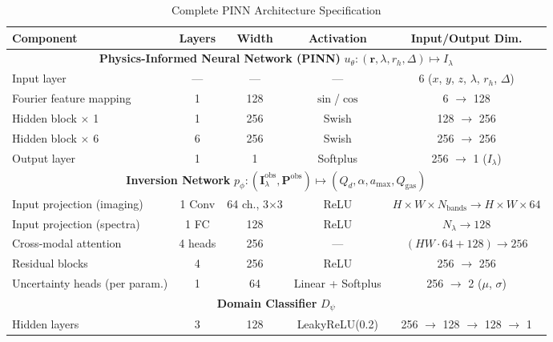 \documentclass[usenatbib]{mnras}
\begin{document}
\begin{table}
\centering
\caption{Complete PINN Architecture Specification}\label{tab:pinn_arch}
\begin{tabular}{lcccc}
\toprule
Component & Layers & Width & Activation & Input/Output Dim. \\
\midrule
\multicolumn{5}{c}{\textbf{Physics-Informed Neural Network (PINN)} $u_\theta: (\mathbf{r}, \lambda, r_h, \Delta) \mapsto I_\lambda$} \\
\hspace{1em}Input layer & --- & --- & --- & 6 ($x$, $y$, $z$, $\lambda$, $r_h$, $\Delta$) \\
\hspace{1em}Fourier feature mapping & 1 & 128 & $\sin$/$\cos$ & 6 $\to$ 128 \\
\hspace{1em}Hidden block $\times$ 1 & 1 & 256 & Swish & 128 $\to$ 256 \\
\hspace{1em}Hidden block $\times$ 6 & 6 & 256 & Swish & 256 $\to$ 256 \\
\hspace{1em}Output layer & 1 & 1 & Softplus & 256 $\to$ 1 ($I_\lambda$) \\
\multicolumn{5}{c}{\textbf{Inversion Network} $p_\phi: (\mathbf{I}_\lambda^{\text{obs}}, \mathbf{P}^{\text{obs}}) \mapsto (Q_d, \alpha, a_{\max}, Q_{\text{gas}})$} \\
\hspace{1em}Input projection (imaging) & 1 Conv & 64 ch., 3$\times$3 & ReLU & $H \times W \times N_{\text{bands}} \to H \times W \times 64$ \\
\hspace{1em}Input projection (spectra) & 1 FC & 128 & ReLU & $N_\lambda \to 128$ \\
\hspace{1em}Cross-modal attention & 4 heads & 256 & --- & $(HW\cdot64 + 128) \to 256$ \\
\hspace{1em}Residual blocks & 4 & 256 & ReLU & 256 $\to$ 256 \\
\hspace{1em}Uncertainty heads (per param.) & 1 & 64 & Linear + Softplus & 256 $\to$ 2 ($\mu$, $\sigma$) \\
\multicolumn{5}{c}{\textbf{Domain Classifier} $D_\psi$} \\
\hspace{1em}Hidden layers & 3 & 128 & LeakyReLU(0.2) & 256 $\to$ 128 $\to$ 128 $\to$ 1 \\

\end{tabular}
\end{table}
\end{document}
